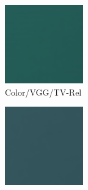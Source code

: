 \begin{figure}
    \begin{subfigure}[t]{.24\textwidth}
        \centering
        \includegraphics[width=\linewidth]{figures/color-vgg-tv-rel-no-noise-patch-single.png}
        \captionsetup{justification=centering}
        \caption{Color/VGG/TV-Rel}
      \end{subfigure}
        \hfill
    \begin{subfigure}[t]{.24\textwidth}
        \centering
        \includegraphics[width=\linewidth]{figures/mse-vgg-no-noise-no-resize-patch-single.png}

\end{subfigure}
\end{figure}
